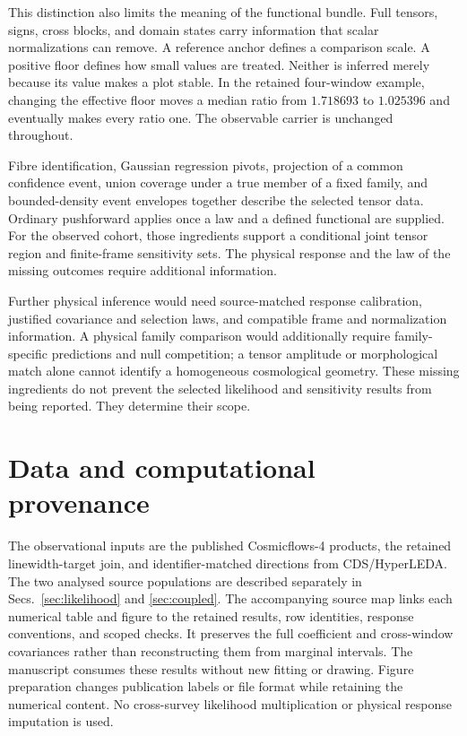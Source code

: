 This distinction also limits the meaning of the functional bundle. Full tensors, signs, cross blocks, and domain states carry information that scalar normalizations can remove. A reference anchor defines a comparison scale. A positive floor defines how small values are treated. Neither is inferred merely because its value makes a plot stable. In the retained four-window example, changing the effective floor moves a median ratio from $1.718693$ to $1.025396$ and eventually makes every ratio one. The observable carrier is unchanged throughout.

Fibre identification, Gaussian regression pivots, projection of a common confidence event, union coverage under a true member of a fixed family, and bounded-density event envelopes together describe the selected tensor data. Ordinary pushforward applies once a law and a defined functional are supplied. For the observed cohort, those ingredients support a conditional joint tensor region and finite-frame sensitivity sets. The physical response and the law of the missing outcomes require additional information.

Further physical inference would need source-matched response calibration, justified covariance and selection laws, and compatible frame and normalization information. A physical family comparison would additionally require family-specific predictions and null competition; a tensor amplitude or morphological match alone cannot identify a homogeneous cosmological geometry. These missing ingredients do not prevent the selected likelihood and sensitivity results from being reported. They determine their scope.

\section*{Data and computational provenance}

The observational inputs are the published Cosmicflows-4 products, the retained linewidth-target join, and identifier-matched directions from CDS/HyperLEDA. The two analysed source populations are described separately in Secs.~\ref{sec:likelihood} and \ref{sec:coupled}. The accompanying source map links each numerical table and figure to the retained results, row identities, response conventions, and scoped checks. It preserves the full coefficient and cross-window covariances rather than reconstructing them from marginal intervals. The manuscript consumes these results without new fitting or drawing. Figure preparation changes publication labels or file format while retaining the numerical content. No cross-survey likelihood multiplication or physical response imputation is used.
